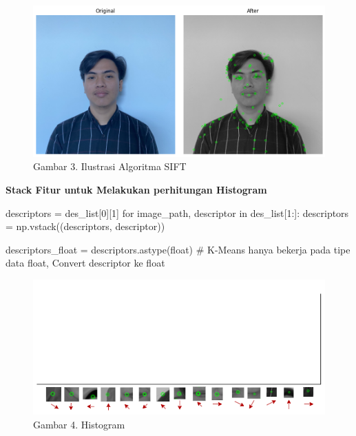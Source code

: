\documentclass[
  letterpaper,
  DIV=11,
  numbers=noendperiod]{scrreprt}
\newenvironment{Shaded}{\begin{snugshade}}{\end{snugshade}}
\newcommand{\BuiltInTok}[1]{\textcolor[rgb]{0.00,0.23,0.31}{#1}}
\newcommand{\CommentTok}[1]{\textcolor[rgb]{0.37,0.37,0.37}{#1}}
\newcommand{\ControlFlowTok}[1]{\textcolor[rgb]{0.00,0.23,0.31}{#1}}
\newcommand{\DecValTok}[1]{\textcolor[rgb]{0.68,0.00,0.00}{#1}}
\newcommand{\KeywordTok}[1]{\textcolor[rgb]{0.00,0.23,0.31}{#1}}
\newcommand{\NormalTok}[1]{\textcolor[rgb]{0.00,0.23,0.31}{#1}}
\newcommand{\OperatorTok}[1]{\textcolor[rgb]{0.37,0.37,0.37}{#1}}
\begin{document}
\begin{figure}

{\centering \includegraphics{Asset/ilustrasiSIFT.png}

}

\caption{Gambar 3. Ilustrasi Algoritma SIFT}

\end{figure}

\textbf{Stack Fitur untuk Melakukan perhitungan Histogram}

\begin{Shaded}
\begin{Highlighting}[]
\NormalTok{descriptors }\OperatorTok{=}\NormalTok{ des\_list[}\DecValTok{0}\NormalTok{][}\DecValTok{1}\NormalTok{]}
\ControlFlowTok{for}\NormalTok{ image\_path, descriptor }\KeywordTok{in}\NormalTok{ des\_list[}\DecValTok{1}\NormalTok{:]:}
\NormalTok{   descriptors }\OperatorTok{=}\NormalTok{ np.vstack((descriptors, descriptor))  }

\NormalTok{descriptors\_float }\OperatorTok{=}\NormalTok{ descriptors.astype(}\BuiltInTok{float}\NormalTok{)  }\CommentTok{\# K{-}Means hanya bekerja pada tipe data float, Convert descriptor ke float}
\end{Highlighting}
\end{Shaded}

\begin{figure}

{\centering \includegraphics{Asset/Histogram.png}

}

\caption{Gambar 4. Histogram}

\end{figure}
\end{document}
